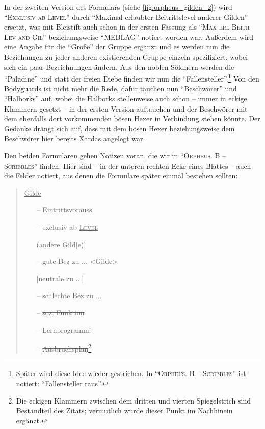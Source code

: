 \documentclass[a5paper,pagesize,numbers=noenddot]{scrbook}
\begin{document}
In der zweiten Version des Formulars (siehe \autoref{fig:orpheus_gilden_2}) wird \enquote{\textsc{Exklusiv ab Level}} durch \enquote{Maximal erlaubter Beitrittslevel anderer Gilden} ersetzt, was mit Bleistift auch schon in der ersten Fassung als \enquote{\textsc{Max erl Beitr Lev and Gil}} beziehungsweise \enquote{MEBLAG} notiert worden war.\autocite[S.~1\,f.]{orpheus_gildensystem}
Außerdem wird eine Angabe für die \enquote{Größe} der Gruppe ergänzt und es werden nun die Beziehungen zu jeder anderen existierenden Gruppe einzeln spezifiziert, wobei sich ein paar Bezeichnungen ändern.
Aus den noblen Söldnern werden die \enquote{Paladine} und statt der freien Diebe finden wir nun die \enquote{Fallensteller}.\footnote{Später wird diese Idee wieder gestrichen.
In \enquote{\textsc{Orpheus. B -- Scribbles}} ist notiert:
\enquote{\uline{Fallensteller raus}}.}
Von den Bodyguards ist nicht mehr die Rede, dafür tauchen nun \enquote{Beschwörer} und \enquote{Halborks} auf, wobei die Halborks stellenweise auch schon -- immer in eckige Klammern gesetzt -- in der ersten Version auftauchen und der Beschwörer mit dem ebenfalls dort vorkommenden bösen Hexer in Verbindung stehen könnte.
Der Gedanke drängt sich auf, dass mit dem bösen Hexer beziehungsweise dem Beschwörer hier bereits Xardas angelegt war.

Den beiden Formularen gehen Notizen voran, die wir in \enquote{\textsc{Orpheus. B -- Scribbles}} finden.\autocite[Vgl.][S.~13--15]{orpheus_b_scribbles}
Hier sind -- in der unteren rechten Ecke eines Blattes -- auch die Felder notiert, aus denen die Formulare später einmal bestehen sollten:

\begin{quote}
   \uline{Gilde}
   \begin{itemize}
      \item[--] Eintrittsvorauss.
      \item[--] exclusiv ab \textsc{\uline{Level}}
      \item[] \phantom{exclusiv ab} (andere Gild[e)]
      \item[--] gute Bez zu $\ldots$ <Gilde>
      \item[] [neutrale zu $\ldots$]
      \item[--] schlechte Bez zu $\ldots$
      \item[--] \sout{soz. Funktion}
      \item[--] Lernprogramm!
      \item[--] \sout{Ausbruchsplan}\footnote{Die eckigen Klammern zwischen dem dritten und vierten Spiegelstrich sind Bestandteil des Zitats; vermutlich wurde dieser Punkt im Nachhinein ergänzt.}
   \end{itemize}
\end{quote}
\end{document}
